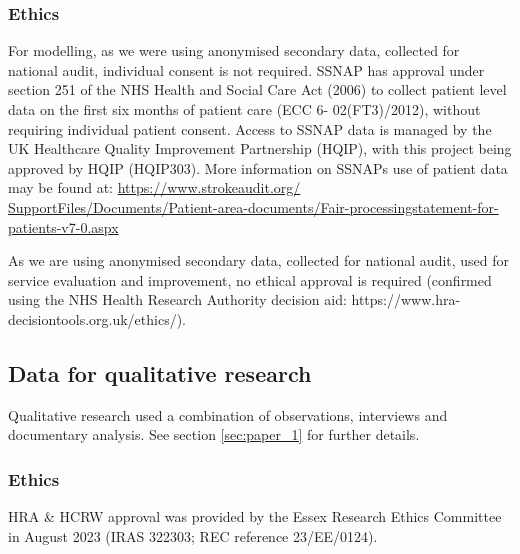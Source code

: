 \subsubsection{Ethics}

For modelling, as we were using anonymised secondary data, collected for national audit, individual consent is not required. SSNAP has approval under section 251 of the NHS Health and Social Care Act (2006) to collect patient level data on the first six months of patient care (ECC 6- 02(FT3)/2012), without requiring individual patient consent. Access to SSNAP data is managed by the UK Healthcare Quality Improvement Partnership (HQIP), with this project being approved by HQIP (HQIP303). More information on SSNAPs use of patient data may be found at: \url{https://www.strokeaudit.org/ SupportFiles/Documents/Patient-area-documents/Fair-processingstatement-for-patients-v7-0.aspx}

As we are using anonymised secondary data, collected for national audit, used for service evaluation and improvement, no ethical approval is required (confirmed using the NHS Health Research Authority decision aid: https://www.hra-decisiontools.org.uk/ethics/).

\subsection{Data for qualitative research}

Qualitative research used a combination of observations, interviews and documentary analysis. See section \ref{sec:paper_1} for further details.

\subsubsection{Ethics}

HRA \& HCRW approval was provided by the Essex Research Ethics Committee in August 2023 (IRAS 322303; REC reference 23/EE/0124).